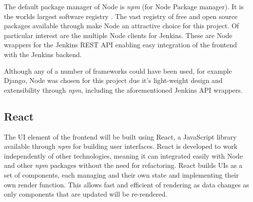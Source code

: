 The default package manager of Node is \textit{npm} (for Node Package manager). It is the worlds largest software registry \citep{npm}. The vast registry of free and open source packages available through make Node an attractive choice for this project. Of particular interest are the multiple Node clients for Jenkins. These are Node wrappers for the Jenkins REST API enabling easy integration of the frontend with the Jenkins backend.

Although any of a number of frameworks could have been used, for example Django, Node was chosen for this project due it's light-weight design and extensibility through \textit{npm}, including the aforementioned Jenkins API wrappers.
 
\subsection{React}
The UI element of the frontend will be built using React, a JavaScript library available through \textit{npm} for building user interfaces. React is developed to work independently of other technologies, meaning it can integrated easily with Node and other \textit{npm} packages without the need for refactoring. React builds UIs as a set of components, each managing and their own state and implementing their own render function. This allows fast and efficient of rendering as data changes as only components that are updated will be re-rendered.

